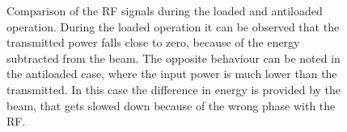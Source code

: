 \begin{figure}[h]
\centering
\caption{Comparison of the RF signals during the loaded and antiloaded operation. During the loaded operation it can be observed that the transmitted power falls close to zero, because of the energy subtracted from the beam. The opposite behaviour can be noted in the antiloaded case, where the input power is much lower than the transmitted. In this case the difference in energy is provided by the beam, that gets slowed down because of the wrong phase with the RF. }
 \label{RF_load}
 \end{figure}




